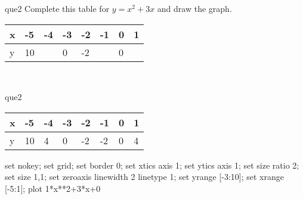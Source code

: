 \documentclass[13.5pt, varwidth=true]{beamer}
\begin{document}
\begin{frame}[shrink=19,fragile]
	\begin{beamercolorbox}[rounded=true, left, shadow=true,wd=14.8cm]{que2}
		 Complete this table for $y = x^{2} + 3x$ and draw the graph. \\[0.3cm] \renewcommand{\arraystretch}{1.2}\begin{tabular}{|C|C|C|C|C|C|C|C|} \hline x & -5 & -4 & -3 & -2 & -1 & 0 & 1 \\ \hline y & 10 &  & 0 & -2 &  & 0 & \\ \hline \end{tabular}\\[0.3cm]
	\end{beamercolorbox}
\end{frame}
\begin{frame}[shrink=19,fragile]
	\begin{beamercolorbox}[rounded=true, left, shadow=true,wd=14.8cm]{que2}
		\renewcommand{\arraystretch}{1.2}\begin{tabular}{|C|C|C|C|C|C|C|C|} \hline x & -5 & -4 & -3 & -2 & -1 & 0 & 1 \\ \hline y & 10 & 4 & 0 & -2 & -2 & 0 & 4\\ \hline \end{tabular}\begin{gnuplot}[terminal=pdf] set nokey; set grid; set border 0; set xtics axis 1; set ytics axis 1; set size ratio 2; set size 1,1; set zeroaxis linewidth 2 linetype 1; set yrange [-3:10]; set xrange [-5:1]; plot 1*x**2+3*x+0 \end{gnuplot}
	\end{beamercolorbox}
\end{frame}
\end{document}
